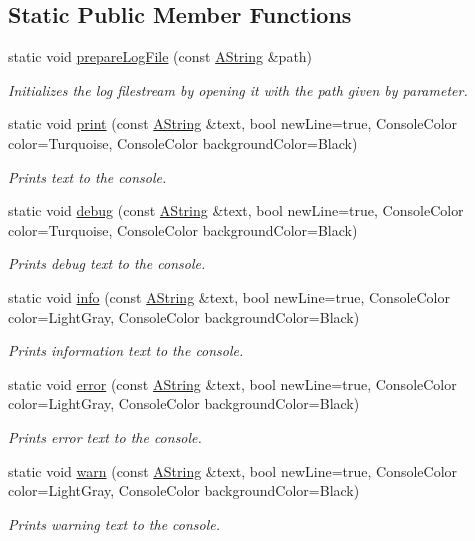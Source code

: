 \subsection*{Static Public Member Functions}
\begin{DoxyCompactItemize}
\item 
static void \mbox{\hyperlink{class_logger_a39b7087d99ea5f1a476fce7eb015ca29}{prepare\+Log\+File}} (const \mbox{\hyperlink{class_a_string}{A\+String}} \&path)
\begin{DoxyCompactList}\small\item\em Initializes the log filestream by opening it with the path given by parameter. \end{DoxyCompactList}\item 
static void \mbox{\hyperlink{class_logger_ad1b7ae86299fa93628358c1b8e77a9b4}{print}} (const \mbox{\hyperlink{class_a_string}{A\+String}} \&text, bool new\+Line=true, Console\+Color color=Turquoise, Console\+Color background\+Color=Black)
\begin{DoxyCompactList}\small\item\em Prints text to the console. \end{DoxyCompactList}\item 
static void \mbox{\hyperlink{class_logger_ab986fb958b936fc1271fd4acf9553971}{debug}} (const \mbox{\hyperlink{class_a_string}{A\+String}} \&text, bool new\+Line=true, Console\+Color color=Turquoise, Console\+Color background\+Color=Black)
\begin{DoxyCompactList}\small\item\em Prints debug text to the console. \end{DoxyCompactList}\item 
static void \mbox{\hyperlink{class_logger_aee760667718f08ead13726b60d8c5ca6}{info}} (const \mbox{\hyperlink{class_a_string}{A\+String}} \&text, bool new\+Line=true, Console\+Color color=Light\+Gray, Console\+Color background\+Color=Black)
\begin{DoxyCompactList}\small\item\em Prints information text to the console. \end{DoxyCompactList}\item 
static void \mbox{\hyperlink{class_logger_a359e37a5d634c018a2aac5ba480e86a0}{error}} (const \mbox{\hyperlink{class_a_string}{A\+String}} \&text, bool new\+Line=true, Console\+Color color=Light\+Gray, Console\+Color background\+Color=Black)
\begin{DoxyCompactList}\small\item\em Prints error text to the console. \end{DoxyCompactList}\item 
static void \mbox{\hyperlink{class_logger_a67f08cc48a12528669b3fcee0bc982fd}{warn}} (const \mbox{\hyperlink{class_a_string}{A\+String}} \&text, bool new\+Line=true, Console\+Color color=Light\+Gray, Console\+Color background\+Color=Black)
\begin{DoxyCompactList}\small\item\em Prints warning text to the console. \end{DoxyCompactList}\end{DoxyCompactItemize}


